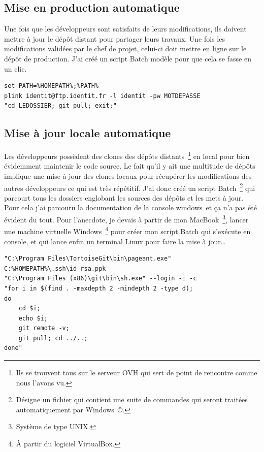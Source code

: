 
\subsection{Mise en production automatique} %

Une fois que les développeurs sont satisfaits de leurs modifications, ils
doivent mettre à jour le dépôt distant pour partager leurs travaux. Une fois
les modifications validées par le chef de projet, celui-ci doit mettre en ligne
sur le dépôt de production. J'ai créé un script Batch \og modèle \fg{} pour
que cela se fasse en un clic.\\

\begin{lstlisting}[basicstyle=\ttfamily\small, frame=trBL]
set PATH=%HOMEPATH%;%PATH%
plink identit@ftp.identit.fr -l identit -pw MOTDEPASSE
"cd LEDOSSIER; git pull; exit;"
\end{lstlisting}


\subsection{Mise à jour locale automatique} %

Les développeurs possèdent des clones des dépôts distants\, \footnote{Ils se
trouvent tous sur le serveur OVH qui sert de point de rencontre comme nous
l'avons vu.} en local pour bien évidemment maintenir le code source. Le fait
qu'il y ait une multitude de dépôts implique une mise à jour des clones locaux
pour récupérer les modifications des autres développeurs ce qui est très
répétitif. J'ai donc créé un script Batch\, \footnote{Désigne un fichier qui
contient une suite de commandes qui seront traitées automatiquement par
Windows\, \copyright.} qui parcourt tous les dossiers englobant les sources des
dépôts et les mets à jour. Pour cela j'ai parcouru la documentation de la
console windows\, et ça n'a pas été évident du tout. Pour l'anecdote, je devais
à partir de mon MacBook\, \footnote{Système de type UNIX.}, lancer une machine
virtuelle Windows\, \footnote{À partir du logiciel VirtualBox.} pour créer mon
script Batch qui s'exécute en console, et qui lance enfin un terminal Linux
pour faire la mise à jour\dots\\

\begin{lstlisting}[basicstyle=\ttfamily\small, frame=trBL]
"C:\Program Files\TortoiseGit\bin\pageant.exe"
C:%HOMEPATH%\.ssh\id_rsa.ppk
"C:\Program Files (x86)\git\bin\sh.exe" --login -i -c
"for i in $(find . -maxdepth 2 -mindepth 2 -type d);
do
    cd $i;
    echo $i;
    git remote -v;
    git pull; cd ../..;
done"
\end{lstlisting}

\clearpage
